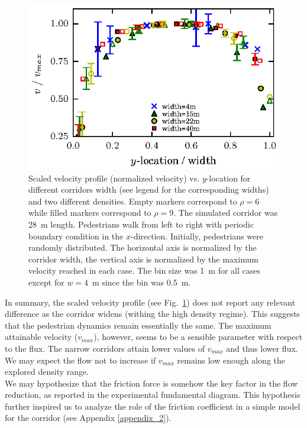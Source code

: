 \begin{figure}[htbp!]
\includegraphics[width=\columnwidth]
{plots/v(y)_multi_width_normaliz.eps}
\caption{\label{speed-profile-width-normaliz} Scaled velocity profile (normalized velocity) vs. $y$-location for different corridors width (see legend for the corresponding widths) and two different densities. Empty markers correspond to $\rho=6$ while filled markers correspond to  $\rho=9$. The simulated corridor was 28~m length. Pedestrians walk from left to right with periodic boundary condition in the $x$-direction. Initially, pedestrians were randomly distributed. The horizontal axis is normalized by the corridor width, the vertical axis is normalized by the maximum velocity reached in each case.  The bin size was 1~m for all cases except for $w=4$~m since the bin was 0.5~m.}
\end{figure}

In summary, the scaled velocity profile (see Fig.~\ref{speed-profile-width-normaliz}) does not report any relevant difference as the corridor widens (withing the high density regime). This suggests that the pedestrian dynamics remain essentially the same. The maximum attainable velocity ($v_{max}$), however, seems to be a sensible parameter with respect to the flux.  The narrow corridors attain lower values of $v_{max}$ and thus lower flux. We may expect the flow not to increase if $v_{max}$ remains low enough along the explored density range.\\


We may hypothesize that the friction force is somehow the key factor in the
flow reduction, as reported in the experimental fundamental diagram. This hypothesis further inspired us to analyze the role of the friction coefficient in a simple model for the corridor (see Appendix \ref{appendix_2}). 


